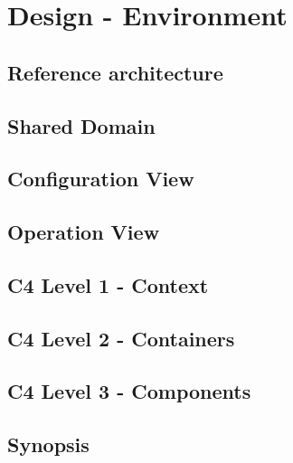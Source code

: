 
\chapter{Design - Environment} %

\label{chap:Chapter6} %


\section{Reference architecture}

\section{Shared Domain}

\section{Configuration View}

\section{Operation View}

\section{C4 Level 1 - Context}

\section{C4 Level 2 - Containers}

\section{C4 Level 3 - Components}

\section{Synopsis}